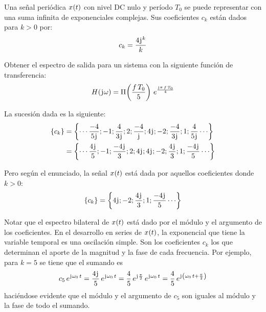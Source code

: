 \begin{mdframed}[style=ExampleFrame]
    \begin{example}
    \end{example}
    Una señal periódica $\fx[x]{t}$ con nivel DC nulo y período $T_0$ se puede representar con una suma infinita de exponenciales complejas.
    Sus coeficientes $c_k$ están dados para $k>0$ por:
    \[
        c_k = \frac{4 \iu^k}{k}
    \]

    Obtener el espectro de salida para un sistema con la siguiente función de transferencia:
    \[
        \fx[H]{\iu \omega} =
        \pulse{f \, T_0}{5}
        \, e^\frac{\iu \pi \, f \, T_0}{4}
    \]
    
    
    La sucesión dada es la siguiente:
    \begin{align*}
        \inBraces{c_k}
        & = \inBraces{\cdots \frac{-4}{5 \iu} ; -1 ; \frac{4}{3 \iu} ; 2 ; \frac{-4}{\iu} ; 4 \iu ; -2 ; \frac{-4}{3 \iu} ; 1 ; \frac{4}{5 \iu} \cdots}
        \\
        & = \inBraces{\cdots \frac{4 \iu}{5} ; -1 ; \frac{-4 \iu}{3} ; 2 ; 4 \iu ; 4 \iu ; -2 ; \frac{4 \iu}{3} ; 1 ; \frac{-4 \iu}{5} \cdots}
    \end{align*}

    Pero según el enunciado, la señal $\fx[x]{t}$ está dada por aquellos coeficientes donde $k>0$:
    \[
        \inBraces{c_k} = \inBraces{4 \iu ; -2 ; \frac{4 \iu}{3} ; 1 ; \frac{-4 \iu}{5} \cdots}
    \]

    Notar que el espectro bilateral de $\fx[x]{t}$ está dado por el módulo y el argumento de los coeficientes.
    En el desarrollo en series de $\fx[x]{t}$, la exponencial que tiene la variable temporal es una oscilación simple.
    Son los coeficientes $c_k$ los que determinan el aporte de la magnitud y la fase de cada frecuencia.
    Por ejemplo, para $k=5$ se tiene que el sumando es
    \[
        c_5 \, e^{\iu \omega_0 \, t}
        = \frac{4 \iu}{5} \, e^{\iu \omega_0 \, t}
        = \frac{4}{5} \, e^{\iu \frac{\pi}{2}} \, e^{\iu \omega_0 \, t}
        = \frac{4}{5} \, e^{\iu \inParentheses{\omega_0 \, t + \frac{\pi}{2}}}
    \]
    haciéndose evidente que el módulo y el argumento de $c_5$ son iguales al módulo y la fase de todo el sumando.


\end{mdframed}
